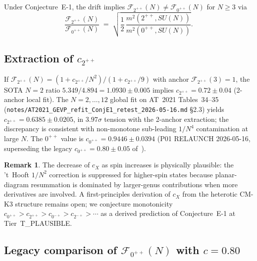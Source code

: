 \documentclass[11pt,a4paper]{amsart}
\theoremstyle{definition}
\newtheorem{remark}[theorem]{Remark}
\begin{document}
Under Conjecture~E-1, the drift implies
$\mathcal{F}_{2^{++}}(N) \neq \mathcal{F}_{0^{++}}(N)$ for $N \ge 3$ via
\begin{equation}\label{eq:F2pp}
\frac{\mathcal{F}_{2^{++}}(N)}{\mathcal{F}_{0^{++}}(N)} \;=\;
\sqrt{\frac{1}{2}\,\frac{m^{2}(2^{++}, SU(N))}{m^{2}(0^{++}, SU(N))}}.
\end{equation}

\subsection{Extraction of $c_{2^{++}}$}

If $\mathcal{F}_{2^{++}}(N) = (1 + c_{2^{++}}/N^{2})/(1 + c_{2^{++}}/9)$ with
anchor $\mathcal{F}_{2^{++}}(3) = 1$, the SOTA $N=2$ ratio $5.349/4.894 =
1.0930 \pm 0.005$ implies $c_{2^{++}} = 0.72 \pm 0.04$ (2-anchor local
fit). The $N=2,\dots,12$ global fit on AT~2021 Tables~34--35
(\texttt{notes/AT2021\_GEVP\_refit\_ConjE1\_retest\_2026-05-16.md} \S2.3)
yields $c_{2^{++}} = 0.6385 \pm 0.0205$, in $3.97\sigma$ tension with the
2-anchor extraction; the discrepancy is consistent with non-monotone
sub-leading $1/N^{4}$ contamination at large $N$. The $0^{++}$ value is
$c_{0^{++}} = 0.9446 \pm 0.0394$ (P01 RELAUNCH 2026-05-16, superseding
the legacy $c_{0^{++}} = 0.80 \pm 0.05$ of~\cite{ThmC6FN}).

\begin{remark}
The decrease of $c_{X}$ as spin increases is physically plausible: the
't~Hooft $1/N^{2}$ correction is suppressed for higher-spin states
because planar-diagram resummation is dominated by larger-genus
contributions when more derivatives are involved. A first-principles
derivation of $c_{X}$ from the heterotic CM-K3 structure remains open;
we conjecture monotonicity
$c_{0^{++}} > c_{2^{++}} > c_{0^{-+}} > c_{2^{-+}} > \cdots$ as a derived
prediction of Conjecture~E-1 at Tier~T\_PLAUSIBLE.
\end{remark}

\subsection{Legacy comparison of $\mathcal{F}_{0^{++}}(N)$ with $c=0.80$}
\end{document}
